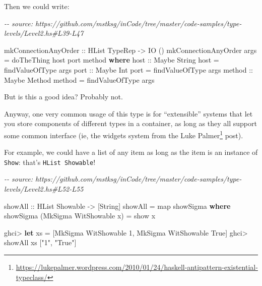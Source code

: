 \documentclass[]{article}
\newenvironment{Shaded}{}{}
\newcommand{\CommentTok}[1]{\textcolor[rgb]{0.38,0.63,0.69}{\textit{#1}}}
\newcommand{\DataTypeTok}[1]{\textcolor[rgb]{0.56,0.13,0.00}{#1}}
\newcommand{\DecValTok}[1]{\textcolor[rgb]{0.25,0.63,0.44}{#1}}
\newcommand{\FunctionTok}[1]{\textcolor[rgb]{0.02,0.16,0.49}{#1}}
\newcommand{\KeywordTok}[1]{\textcolor[rgb]{0.00,0.44,0.13}{\textbf{#1}}}
\newcommand{\NormalTok}[1]{#1}
\newcommand{\OperatorTok}[1]{\textcolor[rgb]{0.40,0.40,0.40}{#1}}
\newcommand{\OtherTok}[1]{\textcolor[rgb]{0.00,0.44,0.13}{#1}}
\newcommand{\StringTok}[1]{\textcolor[rgb]{0.25,0.44,0.63}{#1}}
\renewcommand{\href}[2]{#2\footnote{\url{#1}}}
\begin{document}
Then we could write:

\begin{Shaded}
\begin{Highlighting}[]
\CommentTok{{-}{-} source: https://github.com/mstksg/inCode/tree/master/code{-}samples/type{-}levels/Level2.hs\#L39{-}L47}

\OtherTok{mkConnectionAnyOrder ::} \DataTypeTok{HList} \DataTypeTok{TypeRep} \OtherTok{{-}\textgreater{}} \DataTypeTok{IO}\NormalTok{ ()}
\NormalTok{mkConnectionAnyOrder args }\OtherTok{=}\NormalTok{ doTheThing host port method}
  \KeywordTok{where}
\OtherTok{    host ::} \DataTypeTok{Maybe} \DataTypeTok{String}
\NormalTok{    host }\OtherTok{=}\NormalTok{ findValueOfType args}
\OtherTok{    port ::} \DataTypeTok{Maybe} \DataTypeTok{Int}
\NormalTok{    port }\OtherTok{=}\NormalTok{ findValueOfType args}
\OtherTok{    method ::} \DataTypeTok{Maybe} \DataTypeTok{Method}
\NormalTok{    method }\OtherTok{=}\NormalTok{ findValueOfType args}
\end{Highlighting}
\end{Shaded}

But is this a good idea? Probably not.

Anyway, one very common usage of this type is for ``extensible'' systems that
let you store components of different types in a container, as long as they all
support some common interface (ie, the widgets system from the
\href{https://lukepalmer.wordpress.com/2010/01/24/haskell-antipattern-existential-typeclass/}{Luke
Palmer} post).

For example, we could have a list of any item as long as the item is an instance
of \texttt{Show}: that's \texttt{HList\ Showable}!

\begin{Shaded}
\begin{Highlighting}[]
\CommentTok{{-}{-} source: https://github.com/mstksg/inCode/tree/master/code{-}samples/type{-}levels/Level2.hs\#L52{-}L55}

\OtherTok{showAll ::} \DataTypeTok{HList} \DataTypeTok{Showable} \OtherTok{{-}\textgreater{}}\NormalTok{ [}\DataTypeTok{String}\NormalTok{]}
\NormalTok{showAll }\OtherTok{=} \FunctionTok{map}\NormalTok{ showSigma}
  \KeywordTok{where}
\NormalTok{    showSigma (}\DataTypeTok{MkSigma} \DataTypeTok{WitShowable}\NormalTok{ x) }\OtherTok{=} \FunctionTok{show}\NormalTok{ x}
\end{Highlighting}
\end{Shaded}

\begin{Shaded}
\begin{Highlighting}[]
\NormalTok{ghci}\OperatorTok{\textgreater{}} \KeywordTok{let}\NormalTok{ xs }\OtherTok{=}\NormalTok{ [}\DataTypeTok{MkSigma} \DataTypeTok{WitShowable} \DecValTok{1}\NormalTok{, }\DataTypeTok{MkSigma} \DataTypeTok{WitShowable} \DataTypeTok{True}\NormalTok{]}
\NormalTok{ghci}\OperatorTok{\textgreater{}}\NormalTok{ showAll xs}
\NormalTok{[}\StringTok{"1"}\NormalTok{, }\StringTok{"True"}\NormalTok{]}
\end{Highlighting}
\end{Shaded}
\end{document}
